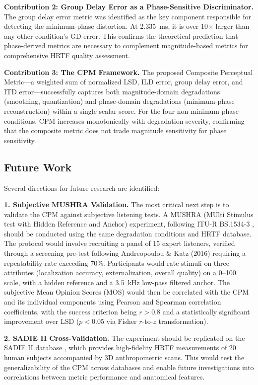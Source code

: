 \documentclass[12pt,a4paper]{article}
\begin{document}
\textbf{Contribution 2: Group Delay Error as a Phase-Sensitive Discriminator.}
The group delay error metric was identified as the key component responsible for detecting the minimum-phase distortion. At 2.335~ms, it is over 10$\times$ larger than any other condition's GD error. This confirms the theoretical prediction that phase-derived metrics are necessary to complement magnitude-based metrics for comprehensive HRTF quality assessment.

\textbf{Contribution 3: The CPM Framework.}
The proposed Composite Perceptual Metric---a weighted sum of normalized LSD, ILD error, group delay error, and ITD error---successfully captures both magnitude-domain degradations (smoothing, quantization) and phase-domain degradations (minimum-phase reconstruction) within a single scalar score. For the four non-minimum-phase conditions, CPM increases monotonically with degradation severity, confirming that the composite metric does not trade magnitude sensitivity for phase sensitivity.

\subsection{Future Work}

Several directions for future research are identified:

\textbf{1. Subjective MUSHRA Validation.}
The most critical next step is to validate the CPM against subjective listening tests. A MUSHRA (MUlti Stimulus test with Hidden Reference and Anchor) experiment, following ITU-R BS.1534-3 \cite{itu2015}, should be conducted using the same degradation conditions and HRTF database. The protocol would involve recruiting a panel of 15 expert listeners, verified through a screening pre-test following Andreopoulou \& Katz (2016) \cite{andreopoulou2016} requiring a repeatability rate exceeding 70\%. Participants would rate stimuli on three attributes (localization accuracy, externalization, overall quality) on a 0--100 scale, with a hidden reference and a 3.5~kHz low-pass filtered anchor. The subjective Mean Opinion Scores (MOS) would then be correlated with the CPM and its individual components using Pearson and Spearman correlation coefficients, with the success criterion being $r > 0.8$ and a statistically significant improvement over LSD ($p < 0.05$ via Fisher $r$-to-$z$ transformation).

\textbf{2. SADIE II Cross-Validation.}
The experiment should be replicated on the SADIE II database \cite{armstrong2018}, which provides high-fidelity HRTF measurements of 20 human subjects accompanied by 3D anthropometric scans. This would test the generalizability of the CPM across databases and enable future investigations into correlations between metric performance and anatomical features.
\end{document}
